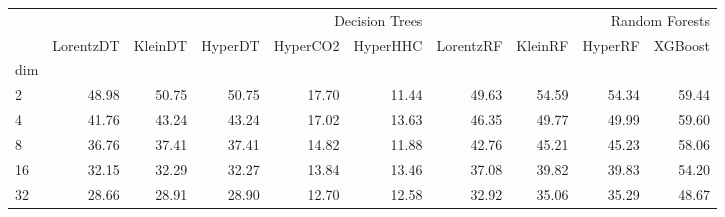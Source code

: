 \begin{tabular}{lrrrrrrrrr}
 & \multicolumn{5}{r}{Decision Trees} & \multicolumn{4}{r}{Random Forests} \\
 & LorentzDT & KleinDT & HyperDT & HyperCO2 & HyperHHC & LorentzRF & KleinRF & HyperRF & XGBoost \\
dim &  &  &  &  &  &  &  &  &  \\
2 & {\cellcolor[HTML]{19833E}} \color[HTML]{F1F1F1} 48.98 & {\cellcolor[HTML]{107A37}} \color[HTML]{F1F1F1} 50.75 & {\cellcolor[HTML]{107A37}} \color[HTML]{F1F1F1} 50.75 & {\cellcolor[HTML]{E4F5DF}} \color[HTML]{000000} 17.70 & {\cellcolor[HTML]{F7FCF5}} \color[HTML]{000000} 11.44 & {\cellcolor[HTML]{16803C}} \color[HTML]{F1F1F1} 49.63 & {\cellcolor[HTML]{006428}} \color[HTML]{F1F1F1} 54.59 & {\cellcolor[HTML]{006729}} \color[HTML]{F1F1F1} 54.34 & {\cellcolor[HTML]{00441B}} \color[HTML]{F1F1F1} 59.44 \\
4 & {\cellcolor[HTML]{46AE60}} \color[HTML]{F1F1F1} 41.76 & {\cellcolor[HTML]{3DA65A}} \color[HTML]{F1F1F1} 43.24 & {\cellcolor[HTML]{3DA65A}} \color[HTML]{F1F1F1} 43.24 & {\cellcolor[HTML]{EDF8E9}} \color[HTML]{000000} 17.02 & {\cellcolor[HTML]{F7FCF5}} \color[HTML]{000000} 13.63 & {\cellcolor[HTML]{2C944C}} \color[HTML]{F1F1F1} 46.35 & {\cellcolor[HTML]{18823D}} \color[HTML]{F1F1F1} 49.77 & {\cellcolor[HTML]{17813D}} \color[HTML]{F1F1F1} 49.99 & {\cellcolor[HTML]{00441B}} \color[HTML]{F1F1F1} 59.60 \\
8 & {\cellcolor[HTML]{65BD6F}} \color[HTML]{F1F1F1} 36.76 & {\cellcolor[HTML]{5EB96B}} \color[HTML]{F1F1F1} 37.41 & {\cellcolor[HTML]{5EB96B}} \color[HTML]{F1F1F1} 37.41 & {\cellcolor[HTML]{EEF8EA}} \color[HTML]{000000} 14.82 & {\cellcolor[HTML]{F7FCF5}} \color[HTML]{000000} 11.88 & {\cellcolor[HTML]{369F54}} \color[HTML]{F1F1F1} 42.76 & {\cellcolor[HTML]{2A924A}} \color[HTML]{F1F1F1} 45.21 & {\cellcolor[HTML]{2A924A}} \color[HTML]{F1F1F1} 45.23 & {\cellcolor[HTML]{00441B}} \color[HTML]{F1F1F1} 58.06 \\
16 & {\cellcolor[HTML]{83CB82}} \color[HTML]{000000} 32.15 & {\cellcolor[HTML]{81CA81}} \color[HTML]{000000} 32.29 & {\cellcolor[HTML]{81CA81}} \color[HTML]{000000} 32.27 & {\cellcolor[HTML]{F6FCF4}} \color[HTML]{000000} 13.84 & {\cellcolor[HTML]{F7FCF5}} \color[HTML]{000000} 13.46 & {\cellcolor[HTML]{53B466}} \color[HTML]{F1F1F1} 37.08 & {\cellcolor[HTML]{3CA559}} \color[HTML]{F1F1F1} 39.82 & {\cellcolor[HTML]{3CA559}} \color[HTML]{F1F1F1} 39.83 & {\cellcolor[HTML]{00441B}} \color[HTML]{F1F1F1} 54.20 \\
32 & {\cellcolor[HTML]{87CD86}} \color[HTML]{000000} 28.66 & {\cellcolor[HTML]{86CC85}} \color[HTML]{000000} 28.91 & {\cellcolor[HTML]{86CC85}} \color[HTML]{000000} 28.90 & {\cellcolor[HTML]{F7FCF5}} \color[HTML]{000000} 12.70 & {\cellcolor[HTML]{F7FCF5}} \color[HTML]{000000} 12.58 & {\cellcolor[HTML]{5AB769}} \color[HTML]{F1F1F1} 32.92 & {\cellcolor[HTML]{42AB5D}} \color[HTML]{F1F1F1} 35.06 & {\cellcolor[HTML]{3FA95C}} \color[HTML]{F1F1F1} 35.29 & {\cellcolor[HTML]{00441B}} \color[HTML]{F1F1F1} 48.67 \\

\end{tabular}
